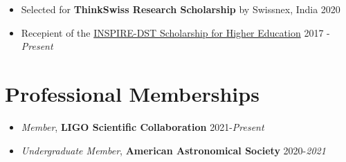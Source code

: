 \documentclass[margin, centered]{res}
\begin{document}
\begin{resume}
\begin{itemize}[leftmargin=*]
 \item Selected for \textbf{ThinkSwiss Research Scholarship} by Swissnex, India \hfill 2020

 \item Recepient of the \href{http://www.inspire-dst.gov.in/scholarship.html}{INSPIRE-DST Scholarship for Higher Education}  \hfill 2017 - \textit{Present}
\end{itemize}


\section{Professional Memberships}
\begin{itemize}[leftmargin=*]
    \item \textit{Member}, \textbf{LIGO Scientific Collaboration} \hfill 2021-\textit{Present}
    \item \textit{Undergraduate Member}, \textbf{American Astronomical Society} \hfill 2020-\textit{2021}\\
\end{itemize}


\end{resume}
\end{document}
